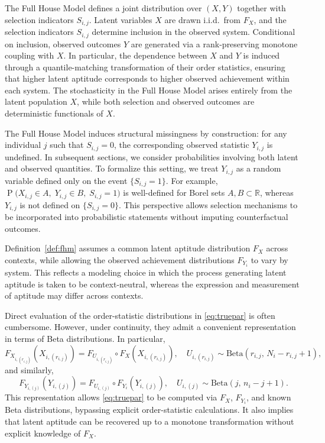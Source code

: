 \documentclass[12pt]{article}
\DeclareMathOperator*{\Prob}{P}
\begin{document}
The Full House Model defines a joint distribution over $(X,Y)$ together with selection indicators $S_{i,j}$. Latent variables $X$ are drawn i.i.d.\ from $F_X$, and the selection indicators $S_{i,j}$ determine inclusion in the observed system. Conditional on inclusion, observed outcomes $Y$ are generated via a rank-preserving monotone coupling with $X$. In particular, the dependence between $X$ and $Y$ is induced through a quantile-matching transformation of their order statistics, ensuring that higher latent aptitude corresponds to higher observed achievement within each system. The stochasticity in the Full House Model arises entirely from the latent population $X$, while both selection and observed outcomes are deterministic functionals of $X$.

The Full House Model induces structural missingness by construction: for any individual $j$ such that $S_{i,j} = 0$, the corresponding observed statistic $Y_{i,j}$ is undefined. In subsequent sections, we consider probabilities involving both latent and observed quantities. To formalize this setting, we treat $Y_{i,j}$ as a random variable defined only on the event $\{S_{i,j}=1\}$. For example, $\Prob\big(X_{i,j}\in A,\; Y_{i,j}\in B,\; S_{i,j} = 1\big)$ is well-defined for Borel sets \(A,B\subset \mathbb R\), whereas $Y_{i,j}$ is not defined on $\{S_{i,j} = 0\}$. This perspective allows selection mechanisms to be incorporated into probabilistic statements without imputing counterfactual outcomes.

Definition~\ref{def:fhm} assumes a common latent aptitude distribution $F_X$ across contexts, while allowing the observed achievement distributions $F_{Y_i}$ to vary by system. This reflects a modeling choice in which the process generating latent aptitude is taken to be context-neutral, whereas the expression and measurement of aptitude may differ across contexts.


Direct evaluation of the order-statistic distributions in \eqref{eq:truepar} is often cumbersome. However, under continuity, they admit a convenient representation in terms of Beta distributions. In particular,
\begin{equation} \label{eq:betarepX}
F_{X_{i,(r_{i,j})}}\!\left(X_{i,(r_{i,j})}\right)
= F_{U_{i,(r_{i,j})}} \circ F_X\!\left(X_{i,(r_{i,j})}\right),
\quad U_{i,(r_{i,j})} \sim \mathrm{Beta}\!\left(r_{i,j},\, N_i - r_{i,j} + 1\right),
\end{equation}
and similarly,
\begin{equation} \label{eq:betarepY}
F_{Y_{i,(j)}}\!\left(Y_{i,(j)}\right)
= F_{U_{i,(j)}} \circ F_{Y_i}\!\left(Y_{i,(j)}\right),
\quad U_{i,(j)} \sim \mathrm{Beta}\!\left(j,\, n_i - j + 1\right).
\end{equation}
This representation allows \eqref{eq:truepar} to be computed via $F_X$, $F_{Y_i}$, and known Beta distributions, bypassing explicit order-statistic calculations. It also implies that latent aptitude can be recovered up to a monotone transformation without explicit knowledge of $F_X$.
\end{document}
